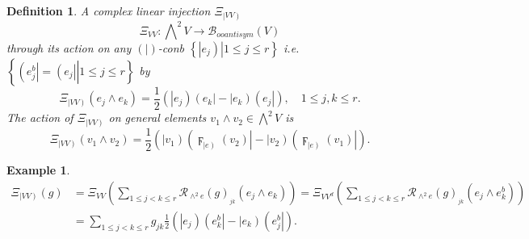 \documentclass[aps,preprint]{revtex4}%
\newtheorem{definition}[theorem]{Definition}
\newtheorem{example}[theorem]{Example}
\begin{document}
\begin{definition}
A complex linear injection $\mathcal{\Xi}_{\left\vert VV\right)  }$
\begin{equation}
\mathcal{\Xi}_{VV}:%
{\textstyle\bigwedge\nolimits^{2}}
V\rightarrow\mathcal{B}_{ooantisym}\left(  V\right)
\end{equation}
through its action on any $\left(  \left.  {}\right\vert \right)  $-conb
$\left\{  \left.  \left\vert e_{j}\right)  \right\vert 1\leq j\leq r\right\}
$ i.e. $\left\{  \left.  \left(  e_{j}^{b}\right\vert =\left(  e_{j}%
\right\vert \right\vert 1\leq j\leq r\right\}  $ by
\begin{equation}
\mathcal{\Xi}_{\left\vert VV\right)  }\left(  e_{j}\wedge e_{k}\right)
=\frac{1}{2}\left(  \left\vert e_{j}\right)  \left(  e_{k}\right\vert
-\left\vert e_{k}\right)  \left(  e_{j}\right\vert \right)  ,\quad1\leq
j,k\leq r.
\end{equation}
The action of $\mathcal{\Xi}_{\left\vert VV\right)  }$ on general elements
$v_{1}\wedge v_{2}\in%
{\textstyle\bigwedge\nolimits^{2}}
V$ is
\begin{equation}
\mathcal{\Xi}_{\left\vert VV\right)  }\left(  v_{1}\wedge v_{2}\right)
=\frac{1}{2}\left(  \left\vert v_{1}\right)  \left(  \digamma_{\left\vert
e\right)  }\left(  v_{2}\right)  \right\vert -\left\vert v_{2}\right)  \left(
\digamma_{\left\vert e\right)  }\left(  v_{1}\right)  \right\vert \right)  .
\end{equation}

\end{definition}

\begin{example}%
\begin{align}
\mathcal{\Xi}_{\left\vert VV\right)  }\left(  g\right)   &  =\mathcal{\Xi
}_{VV}\left(  \sum_{1\leq j<k\leq r}\mathcal{R}_{\wedge^{2}e}\left(  g\right)
_{_{jk}}\left(  \overset{}{e_{j}\wedge e_{k}}\right)  \right)  =\mathcal{\Xi
}_{VV^{d}}\left(  \sum_{1\leq j<k\leq r}\mathcal{R}_{\wedge^{2}e}\left(
g\right)  _{_{jk}}\left(  \overset{}{e_{j}\wedge e_{k}^{b}}\right)  \right) \\
&  =\sum_{1\leq j<k\leq r}g_{jk}\frac{1}{2}\left(  \left\vert e_{j}\right)
\left(  e_{k}^{b}\right\vert -\left\vert e_{k}\right)  \left(  e_{j}%
^{b}\right\vert \right)  .
\end{align}

\end{example}
\end{document}

